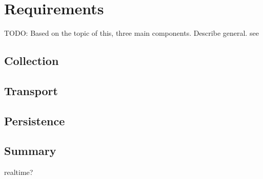 \chapter{Requirements}

TODO:
Based on the topic of this, three main components. Describe general. see \cite{VanL14}

\section{Collection}

\section{Transport}

\section{Persistence}

\section{Summary}

realtime?